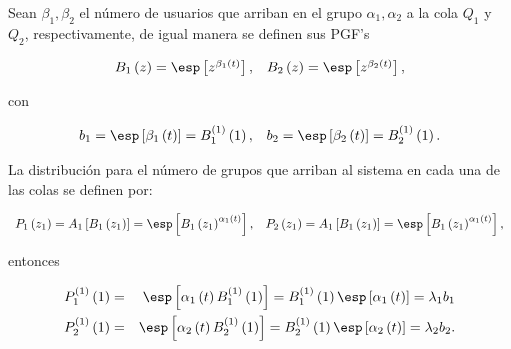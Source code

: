 Sean $\beta_{1},\beta_{2}$ el n\'umero de usuarios que arriban en
el grupo $\alpha_{1},\alpha_{2}$ a la cola $Q_{1}$ y $Q_{2}$,
respectivamente, de igual manera se definen sus PGF's

\begin{eqnarray*}
\begin{array}{cc}
B_{1}\left(z\right)=\esp\left[z^{\beta_{1}\left(t\right)}\right],&
B_{2}\left(z\right)=\esp\left[z^{\beta_{2}\left(t\right)}\right],\\
\end{array}
\end{eqnarray*}

con

\begin{eqnarray*}
\begin{array}{cc}
b_{1}=\esp\left[\beta_{1}\left(t\right)\right]=B_{1}^{(1)}\left(1\right),&
b_{2}=\esp\left[\beta_{2}\left(t\right)\right]=B_{2}^{(1)}\left(1\right).\\
\end{array}
\end{eqnarray*}

La distribuci\'on para el n\'umero de grupos que arriban al
sistema en cada una de las colas se definen por:

\begin{eqnarray*}
\begin{array}{cc}
P_{1}\left(z_{1}\right)=A_{1}\left[B_{1}\left(z_{1}\right)\right]=\esp\left[B_{1}\left(z_{1}\right)^{\alpha_{1}\left(t\right)}\right],&
P_{2}\left(z_{1}\right)=A_{1}\left[B_{1}\left(z_{1}\right)\right]=\esp\left[B_{1}\left(z_{1}\right)^{\alpha_{1}\left(t\right)}\right],\\
\end{array}
\end{eqnarray*}

entonces

\begin{eqnarray*}
P_{1}^{(1)}\left(1\right)&=&\esp\left[\alpha_{1}\left(t\right)B_{1}^{(1)}\left(1\right)\right]=B_{1}^{(1)}\left(1\right)\esp\left[\alpha_{1}\left(t\right)\right]=\lambda_{1}b_{1}\\
P_{2}^{(1)}\left(1\right)&=&\esp\left[\alpha_{2}\left(t\right)B_{2}^{(1)}\left(1\right)\right]=B_{2}^{(1)}\left(1\right)\esp\left[\alpha_{2}\left(t\right)\right]=\lambda_{2}b_{2}.\\
\end{eqnarray*}





